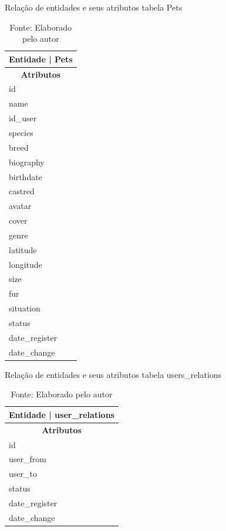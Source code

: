 \begin{table}[htb]
  \centering
  \caption{Relação de entidades e seus atributos tabela Pets}
  \begin{tabular}{|p{4cm}|}
    \hline
    \multicolumn{2}{|c|}{\textbf{Entidade} | \textbf{Pets}} \\
    \hline
    \multicolumn{1}{|c|}{\textbf{Atributos}} \\
    \hline
    id \\
    \hline
    name \\
    \hline
    id\_user \\
    \hline
    species \\
    \hline
    breed \\
    \hline
    biography \\
    \hline
    birthdate \\
    \hline
    castred \\
    \hline
    avatar \\
    \hline
    cover \\
    \hline
    genre \\
    \hline
    latitude \\
    \hline
    longitude \\
    \hline
    size \\
    \hline
    fur \\
    \hline
    situation \\
    \hline
    status \\
    \hline
    date\_register \\
    \hline
    date\_change \\
    \hline
  \end{tabular}
  \caption*{\small Fonte: Elaborado pelo autor}
  \label{tab:Plataformas1}
\end{table}

\begin{table}[htb]
  \centering
  \caption{Relação de entidades e seus atributos tabela users\_relations}
  \begin{tabular}{|p{4cm}|}
    \hline
    \multicolumn{2}{|c|}{\textbf{Entidade} | \textbf{user\_relations}} \\
    \hline
    \multicolumn{1}{|c|}{\textbf{Atributos}} \\
    \hline
    id \\
    \hline
    user\_from \\
    \hline
    user\_to \\
    \hline
    status \\
    \hline
    date\_register \\
    \hline
    date\_change \\
    \hline
  \end{tabular}
  \caption*{\small Fonte: Elaborado pelo autor}
  \label{tab:Plataformas1}
\end{table}


